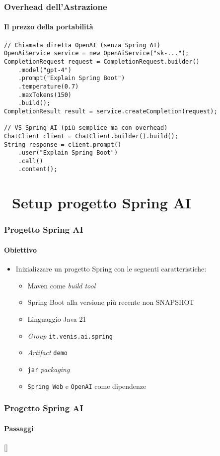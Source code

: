 %
\begin{frame}[t,fragile] \frametitle{Overhead dell'Astrazione}
	{\small
		\framesubtitle{Il prezzo della portabilità}
\begin{verbatim}
// Chiamata diretta OpenAI (senza Spring AI)
OpenAiService service = new OpenAiService("sk-...");
CompletionRequest request = CompletionRequest.builder()
    .model("gpt-4")
    .prompt("Explain Spring Boot")
    .temperature(0.7)
    .maxTokens(150)
    .build();
CompletionResult result = service.createCompletion(request);

// VS Spring AI (più semplice ma con overhead)  
ChatClient client = ChatClient.builder().build();
String response = client.prompt()
    .user("Explain Spring Boot")
    .call()
    .content();
\end{verbatim}
		}
\end{frame}
%
\section{\faWrench\ Setup progetto Spring AI} %
\label{sec:spring-ai-project-setup}
%
\begin{frame}[t,fragile] \frametitle{Progetto Spring AI}
    \framesubtitle{Obiettivo}
    \begin{itemize}[leftmargin=10pt,align=right]
        \item[\alert{\faHandORight}] Inizializzare un progetto Spring con le seguenti caratteristiche:     
        \begin{itemize}[leftmargin=10pt,align=right]
            \item[\alert{\faHandORight}] \alert{Maven} come \textit{build tool}
            \item[\alert{\faHandORight}] Spring Boot alla versione più recente \alert{non SNAPSHOT}
            \item[\alert{\faHandORight}] Linguaggio \alert{Java 21}
            \item[\alert{\faHandORight}] \textit{Group} \alert{\texttt{it.venis.ai.spring}}
            \item[\alert{\faHandORight}] \textit{Artifact} \alert{\texttt{demo}}
            \item[\alert{\faHandORight}] \alert{\texttt{jar}} \textit{packaging}
            \item[\alert{\faHandORight}] \alert{\texttt{Spring Web}} e \alert{\texttt{OpenAI}} come dipendenze
        \end{itemize}
    \end{itemize}
\end{frame}
%
\begin{frame}[t,fragile] \frametitle{Progetto Spring AI}
    \framesubtitle{Passaggi}
    []
    \tableofcontents[sections={2}]
\end{frame}
%

